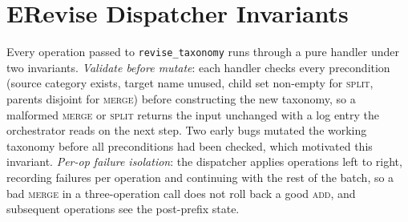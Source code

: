 \section*{E\quad Revise Dispatcher Invariants}
\label{app:dispatcher}
Every operation passed to \texttt{revise\_taxonomy} runs through a pure
handler under two invariants. \emph{Validate before mutate}: each
handler checks every precondition (source category exists, target name
unused, child set non-empty for \textsc{split}, parents disjoint for
\textsc{merge}) before constructing the new taxonomy, so a malformed
\textsc{merge} or \textsc{split} returns the input unchanged with a log
entry the orchestrator reads on the next step. Two early bugs mutated
the working taxonomy before all preconditions had been checked, which
motivated this invariant. \emph{Per-op failure isolation}: the
dispatcher applies operations left to right, recording failures per
operation and continuing with the rest of the batch, so a bad
\textsc{merge} in a three-operation call does not roll back a good
\textsc{add}, and subsequent operations see the post-prefix state.
